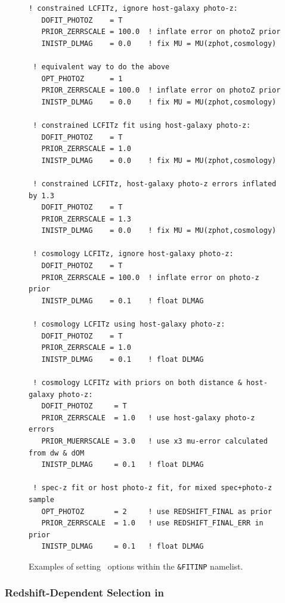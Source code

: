 \documentclass[12pt]{article}
\begin{document}
\begin{figure}[hb] 
\begin{center}
\caption{
  Examples of setting \lcfitz\ options within the
  {\tt \&FITINP} namelist.
 }
\label{fig:photoZ}
%
\begin{Verbatim}[frame=single]
 ! constrained LCFITz, ignore host-galaxy photo-z:
   DOFIT_PHOTOZ    = T
   PRIOR_ZERRSCALE = 100.0  ! inflate error on photoZ prior
   INISTP_DLMAG    = 0.0    ! fix MU = MU(zphot,cosmology)

 ! equivalent way to do the above
   OPT_PHOTOZ      = 1
   PRIOR_ZERRSCALE = 100.0  ! inflate error on photoZ prior
   INISTP_DLMAG    = 0.0    ! fix MU = MU(zphot,cosmology)

 ! constrained LCFITz fit using host-galaxy photo-z:
   DOFIT_PHOTOZ    = T
   PRIOR_ZERRSCALE = 1.0
   INISTP_DLMAG    = 0.0    ! fix MU = MU(zphot,cosmology)

 ! constrained LCFITz, host-galaxy photo-z errors inflated by 1.3
   DOFIT_PHOTOZ    = T
   PRIOR_ZERRSCALE = 1.3
   INISTP_DLMAG    = 0.0    ! fix MU = MU(zphot,cosmology)

 ! cosmology LCFITz, ignore host-galaxy photo-z:
   DOFIT_PHOTOZ    = T
   PRIOR_ZERRSCALE = 100.0  ! inflate error on photo-z prior
   INISTP_DLMAG    = 0.1    ! float DLMAG

 ! cosmology LCFITz using host-galaxy photo-z:
   DOFIT_PHOTOZ    = T
   PRIOR_ZERRSCALE = 1.0   
   INISTP_DLMAG    = 0.1    ! float DLMAG

 ! cosmology LCFITz with priors on both distance & host-galaxy photo-z:
   DOFIT_PHOTOZ     = T
   PRIOR_ZERRSCALE  = 1.0   ! use host-galaxy photo-z errors   
   PRIOR_MUERRSCALE = 3.0   ! use x3 mu-error calculated from dw & dOM
   INISTP_DLMAG     = 0.1   ! float DLMAG

 ! spec-z fit or host photo-z fit, for mixed spec+photo-z sample
   OPT_PHOTOZ       = 2     ! use REDSHIFT_FINAL as prior
   PRIOR_ZERRSCALE  = 1.0   ! use REDSHIFT_FINAL_ERR in prior
   INISTP_DLMAG     = 0.1   ! float DLMAG
\end{Verbatim}
\end{center}
\end{figure}



   \clearpage
   \subsubsection{Redshift-Dependent Selection in \lcfitz\ }
   \label{sss:dropfilter_photoz}
\end{document}
